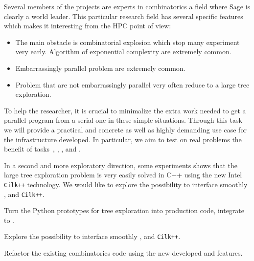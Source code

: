 \begin{workpackage}[id=hpc,wphases=36-48,
  title=High Performance Computing,
  PSRM=1, %
  LLRM=12, %
  SARM=1, %
  UKRM=1, %
  UBRM=1, %
  UJFRM=12]
\begin{tasklist}
\begin{task}[title=HPC infrastructure for combinatorics,id=hpc _combi]

  Several members of the projects are experts in combinatorics a field where
  Sage is clearly a world leader. This particular research field has several
  specific features which makes it interesting from the HPC point of view:
  \begin{itemize}
  \item The main obstacle is combinatorial explosion which stop many
    experiment very early. Algorithm of exponential complexity are extremely
    common.
  \item Embarrassingly parallel problem are extremely common.
  \item Problem that are not embarrassingly parallel very often reduce to a
    large tree exploration.
  \end{itemize}
  To help the researcher, it is crucial to minimalize the extra work needed to
  get a parallel program from a serial one in these simple situations. Through
  this task we will provide a practical and concrete as well as highly
  demanding use case for the infrastructure developed. In particular, we aim
  to test on real problems the benefit of tasks~,
  , ,
  and .

  In a second and more exploratory direction, some experiments shows that the
  large tree exploration problem is very easily solved in C++ using the new
  Intel \texttt{Cilk++} technology. We would like to explore the possibility to
  interface smoothly \Pythran, \Cython and \texttt{Cilk++}.
\end{task}
\end{tasklist}

\begin{wpdelivs}
  \begin{wpdeliv}[due=3,id=HPCcombi,dissem=??,nature=??]
      {Turn the Python prototypes for tree exploration into    production code, integrate to \Sage.}
\end{wpdeliv}
  \begin{wpdeliv}[due=12,id=HPCcombi,dissem=??,nature=??]
      {Explore the possibility to    interface smoothly \Pythran, \Cython and \texttt{Cilk++}.}
\end{wpdeliv}
  \begin{wpdeliv}[due=24,id=HPCcombi,dissem=??,nature=??]
      {Refactor the existing combinatorics \Sage    code using the new developed  \Pythran and \Cython features.}
\end{wpdeliv}
\end{wpdelivs}


\end{workpackage}

